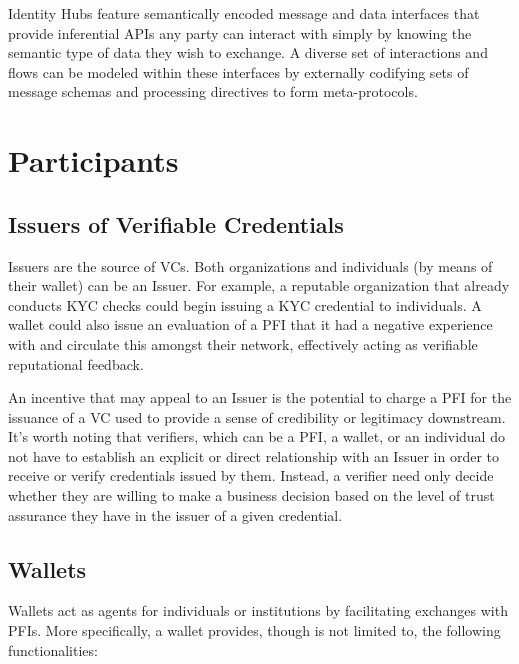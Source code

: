 \documentclass[11pt]{article}
\begin{document}
\vspace{1\baselineskip}
Identity Hubs feature semantically encoded message and data interfaces that provide inferential APIs any party can interact with simply by knowing the semantic type of data they wish to exchange. A diverse set of interactions and flows can be modeled within these interfaces by externally codifying sets of message schemas and processing directives to form meta-protocols.

\section{Participants}

\vspace{1\baselineskip}
\subsection{Issuers of Verifiable Credentials}

\vspace{1\baselineskip}
Issuers are the source of VCs. Both organizations and individuals (by means of their wallet) can be an Issuer. For example, a reputable organization that already conducts KYC checks could begin issuing a KYC credential to individuals. A wallet could also issue an evaluation of a PFI that it had a negative experience with and circulate this amongst their network, effectively acting as verifiable reputational feedback. 

\vspace{1\baselineskip}
An incentive that may appeal to an Issuer is the potential to charge a PFI for the issuance of a VC used to provide a sense of credibility or legitimacy downstream. It’s worth noting that verifiers, which can be a PFI, a wallet, or an individual do not have to establish an explicit or direct relationship with an Issuer in order to receive or verify credentials issued by them. Instead, a verifier need only decide whether they are willing to make a business decision based on the level of trust assurance they have in the issuer of a given credential.

\vspace{1\baselineskip}
\subsection{Wallets}

\vspace{1\baselineskip}
Wallets act as agents for individuals or institutions by facilitating exchanges with PFIs. More specifically, a wallet provides, though is not limited to, the following functionalities:
\end{document}
